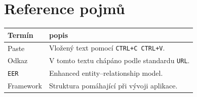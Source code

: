 \documentclass[a4paper,10pt]{report}
\begin{document}
\appendix

\chapter{Reference pojmů}

\begin{tabular}{| l | p{10cm} |}
\hline
Termín & popis \\
\hline
Paste & Vložený text pomocí \texttt{CTRL+C CTRL+V}. \\
Odkaz & V tomto textu chápáno podle standardu \texttt{URL}. \\
\texttt{EER} & Enhanced entity–relationship model. \\
Framework & Struktura pomáhající při vývoji aplikace. \\
\hline
\end{tabular}



\end{document}
